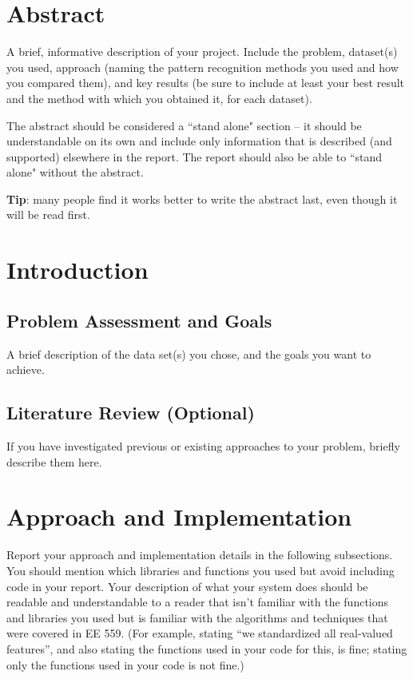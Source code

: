 \documentclass[singlecolumn]{article}
\begin{document}
\section{Abstract}
A brief, informative description of your project. Include the problem, dataset(s) you used, approach (naming the pattern recognition methods you used and how you compared them), and key results (be sure to include at least your best result and the method with which you obtained it, for each dataset).

The abstract should be considered a ``stand alone" section – it should be understandable on its own and include only information that is described (and supported) elsewhere in the report. The report should also be able to ``stand alone" without the abstract.
 
\textbf{Tip}: many people find it works better to write the abstract last, even though it will be read first. 

\section{Introduction}
\subsection{Problem Assessment and Goals}
A brief description of the data set(s) you chose, and the goals you want to achieve.

\subsection{Literature Review (Optional)}
If you have investigated previous or existing approaches to your problem, briefly describe them here. 

\section{Approach and Implementation}
Report your approach and implementation details in the following subsections. You should mention which libraries and functions you used but avoid including code in your report. Your description of what your system does should be readable and understandable to a reader that isn’t familiar with the functions and libraries you used but is familiar with the algorithms and techniques that were covered in EE 559. (For example, stating “we standardized all real-valued features”, and also stating the functions used in your code for this, is fine; stating only the functions used in your code is not fine.) 
\end{document}
